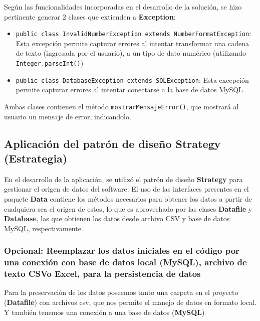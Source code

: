 Según las funcionalidades incorporadas en el desarrollo de la solución, se hizo pertinente generar 2 clases que extienden a \textbf{Exception}:

\begin{itemize}
    \item \texttt{public class InvalidNumberException extends NumberFormatException}: Esta excepción permite capturar errores al intentar transformar una cadena de texto (ingresada por el usuario), a un típo de dato numérico (utilizando \texttt{Integer.parseInt()})
    \item \texttt{public class DatabaseException extends SQLException}: Esta excepción permite capturar errores al intentar conectarse a la base de datos MySQL
\end{itemize}

Ambas clases contienen el método \texttt{mostrarMensajeError()}, que mostrará al usuario un mensaje de error, indicandolo.

\subsection{Aplicación del patrón de diseño Strategy (Estrategia)}

En el desarrollo de la aplicación, se utilizó el patrón de diseño \textbf{Strategy} para gestionar el origen de datos del software. El uso de las interfaces presentes en el paquete \textbf{Data} contiene los métodos necesarios para obtener los datos a partir de cualquiera sea el origen de estos, lo que es aprovechado por las clases \textbf{Datafile} y \textbf{Database}, las que obtienen los datos desde archivo CSV y base de datos MySQL, respectivamente.

\clearpage

\subsubsection*{Opcional: Reemplazar los datos iniciales en el código por una conexión con base de datos local (MySQL), archivo de texto CSVo Excel, para la persistencia de datos}

Para la preservación de los datos poseemos tanto una carpeta en el proyecto (\textbf{Datafile}) con archivos csv, que nos permite el manejo de datos en formato local. Y también tenemos una conexión a una base de datos (\textbf{MySQL})

